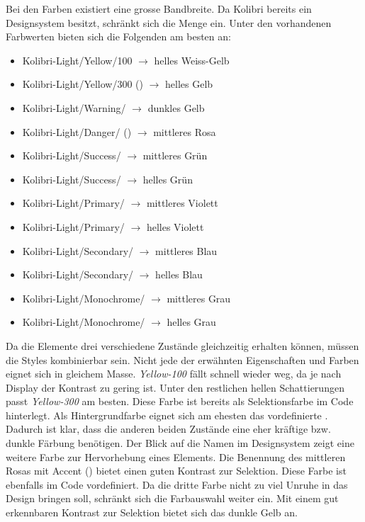 Bei den Farben existiert eine grosse Bandbreite. 
Da Kolibri bereits ein Designsystem besitzt, schränkt sich die Menge ein. 
Unter den vorhandenen Farbwerten bieten sich die Folgenden am besten an: 

\begin{itemize}
    \item Kolibri-Light/Yellow/100 $\rightarrow$ helles Weiss-Gelb
    \item Kolibri-Light/Yellow/300 () $\rightarrow$ helles Gelb
    \item Kolibri-Light/Warning/ $\rightarrow$ dunkles Gelb
    \item Kolibri-Light/Danger/ () $\rightarrow$ mittleres Rosa
    \item Kolibri-Light/Success/ $\rightarrow$ mittleres Grün
    \item Kolibri-Light/Success/ $\rightarrow$ helles Grün
    \item Kolibri-Light/Primary/ $\rightarrow$ mittleres Violett
    \item Kolibri-Light/Primary/ $\rightarrow$ helles Violett
    \item Kolibri-Light/Secondary/ $\rightarrow$ mittleres Blau
    \item Kolibri-Light/Secondary/ $\rightarrow$ helles Blau
    \item Kolibri-Light/Monochrome/ $\rightarrow$ mittleres Grau
    \item Kolibri-Light/Monochrome/ $\rightarrow$ helles Grau
\end{itemize}

Da die Elemente drei verschiedene Zustände gleichzeitig erhalten können, müssen die Styles kombinierbar sein. 
Nicht jede der erwähnten Eigenschaften und Farben eignet sich in gleichem Masse. 
\emph{Yellow-100} fällt schnell wieder weg, da je nach Display der Kontrast zu gering ist. 
Unter den restlichen hellen Schattierungen passt \emph{Yellow-300} am besten. 
Diese Farbe ist bereits als Selektionsfarbe im Code hinterlegt. 
Als Hintergrundfarbe eignet sich am ehesten das vordefinierte . 
Dadurch ist klar, dass die anderen beiden Zustände eine eher kräftige bzw. dunkle Färbung benötigen. 
Der Blick auf die Namen im Designsystem zeigt eine weitere Farbe zur Hervorhebung eines Elements. 
Die Benennung des mittleren Rosas mit Accent () bietet einen guten Kontrast zur Selektion. 
Diese Farbe ist ebenfalls im Code vordefiniert. 
Da die dritte Farbe nicht zu viel Unruhe in das Design bringen soll, schränkt sich die Farbauswahl weiter ein. 
Mit einem gut erkennbaren Kontrast zur Selektion bietet sich das dunkle Gelb  an. 

